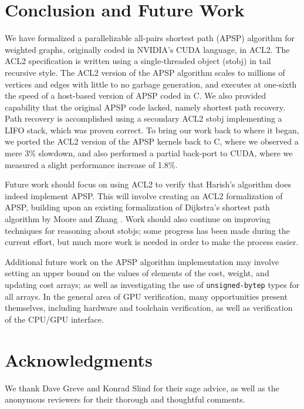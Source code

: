 \documentclass[copyright]{eptcs}
\begin{document}
\section{Conclusion and Future Work}

We have formalized a parallelizable all-pairs shortest path (APSP) 
algorithm for weighted graphs, originally coded in NVIDIA's CUDA
language, in ACL2.  The ACL2 specification is written using a 
single-threaded object (stobj) in tail recursive style.  The ACL2 
version of the APSP algorithm scales to millions of vertices and edges  
with little to no garbage generation, and executes at one-sixth 
the speed of a host-based version of APSP coded in C.  We also 
provided capability that the original APSP code lacked, namely 
shortest path recovery.  Path recovery is accomplished using a 
secondary ACL2 stobj implementing a LIFO stack, which was proven
correct.  To bring our work back to where it began, we ported 
the ACL2 version of the APSP kernels back to C, where we 
observed a mere 3\% slowdown, and also performed a partial 
back-port to CUDA, where we measured a slight 
performance increase of 1.8\%.

Future work should focus on using ACL2 to verify that 
Harish's algorithm does indeed implement APSP.  This will 
involve creating an ACL2 formalization of APSP, building 
upon an existing formalization of Dijkstra's shortest path algorithm by 
Moore and Zhang \cite{Dijkstra-SSSP-ACL2}.  Work should also 
continue on improving techniques for reasoning about stobjs; 
some progress has been made during the current effort, but much 
more work is needed in order to make the process easier.

Additional future work on the APSP algorithm implementation 
may involve setting an upper bound 
on the values of elements of the cost, weight, and updating 
cost arrays; as well as investigating the use of
\texttt{unsigned-bytep} types for all arrays.  In the general 
area of GPU verification, many opportunities present 
themselves, including hardware and toolchain 
verification, as well as verification of the CPU/GPU 
interface.

\section{Acknowledgments}

We thank Dave Greve and Konrad Slind for their sage advice, as well as  
the anonymous reviewers for their thorough and thoughtful comments.



\end{document}
